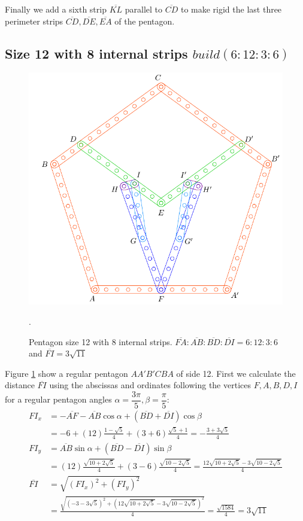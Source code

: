 \documentclass[11pt]{article}
\begin{document}
Finally we add a sixth strip $\overline{KL}$ parallel to $\overline{CD}$ to make rigid the last three perimeter strips $\overline{CD},\overline{DE},\overline{EA}$ of the pentagon.

\subsection{Size 12 with 8 internal strips $build(6:12:3:6)$}

\begin{figure}[h]
 \centering
 \includegraphics[scale=0.8]{12/penta12-8a}
 \caption{Pentagon size 12 with 8 internal strips. $\overline{FA}:\overline{AB}:\overline{BD}:\overline{DI} = 6:12:3:6$ and $\overline{FI} = 3\sqrt{11}$}.
 \label{fig:penta12-8a}
\end{figure}

Figure \ref{fig:penta12-8a} show a regular pentagon $AA'B'CBA$ of side 12.
First we calculate the distance $\overline{FI}$ using the abscissas and ordinates following the vertices $F,A,B,D,I$ for a regular pentagon angles $\alpha=\dfrac{3\pi}5, \beta=\dfrac{\pi}5$:
\begin{align}
FI_x &= -\overline{AF} - \overline{AB}\cos\alpha + (\overline{BD} + \overline{DI})\cos\beta\nonumber\\
 &= -6 + (12)\frac{1-\sqrt5}4 + (3+6)\frac{\sqrt5+1}4 = -\frac{3+3\sqrt5}4\\
FI_y &= \overline{AB}\sin\alpha + (\overline{BD}-\overline{DI})\sin\beta\nonumber\\
 &= (12)\frac{\sqrt{10+2\sqrt5}}4 + (3-6)\frac{\sqrt{10-2\sqrt5}}4
 = \frac{12\sqrt{10+2\sqrt5} - 3\sqrt{10-2\sqrt5}}4\\
\overline{FI} &= \sqrt{(FI_x)^2 + (FI_y)^2}\nonumber\\
 &= \frac{\sqrt{(-3-3\sqrt5)^2 + (12\sqrt{10+2\sqrt5} - 3\sqrt{10-2\sqrt5})^2}}4
 = \frac{\sqrt{1584}}4 = 3\sqrt{11}
\end{align}
\end{document}
